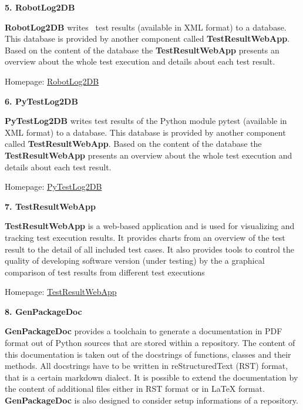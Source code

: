 \vspace{2ex}

\textbf{5. RobotLog2DB}

\textbf{RobotLog2DB} writes \rfwcore\ test results (available in XML format) to a database. This database is provided by another component
called \textbf{TestResultWebApp}. Based on the content of the database the \textbf{TestResultWebApp} presents an overview about the whole test execution
and details about each test result.

Homepage: \href{https://github.com/test-fullautomation/robotframework-robotlog2db}{RobotLog2DB}

\vspace{2ex}

\textbf{6. PyTestLog2DB}

\textbf{PyTestLog2DB} writes test results of the Python module pytest (available in XML format) to a database. This database is provided by another component
called \textbf{TestResultWebApp}. Based on the content of the database the \textbf{TestResultWebApp} presents an overview about the whole test execution
and details about each test result.

Homepage: \href{https://github.com/test-fullautomation/python-pytestlog2db}{PyTestLog2DB}

\vspace{2ex}

\textbf{7. TestResultWebApp}

\textbf{TestResultWebApp} is a web-based application and is used for visualizing and tracking test execution results. It provides charts from an overview of
the test result to the detail of all included test cases. It also provides tools to control the quality of developing software version (under testing)
by the a graphical comparison of test results from different test executions

Homepage: \href{https://github.com/test-fullautomation/testresultwebapp}{TestResultWebApp}

\vspace{2ex}

\textbf{8. GenPackageDoc}

\textbf{GenPackageDoc} provides a toolchain to generate a documentation in PDF format out of Python sources that are stored within a repository.
The content of this documentation is taken out of the docstrings of functions, classes and their methods. All docstrings have to be written in
reStructuredText (RST) format, that is a certain markdown dialect.
It is possible to extend the documentation by the content of additional files either in RST format or in LaTeX format.
\textbf{GenPackageDoc} is also designed to consider setup informations of a repository.


